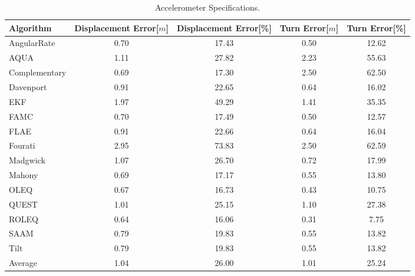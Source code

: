 \begin{table}[H]
    \begin{center}
        \begin{tabular}[t]{lcccc}
            \hline
            Algorithm                   & Displacement Error[$m$] & Displacement Error[\%]      & Turn Error[$m$]  & Turn Error[\%]             \\
            \hline 
            AngularRate            & 0.70  & 17.43 & 0.50 & 12.62              \\            AQUA            & 1.11  & 27.82 & 2.23 & 55.63              \\            Complementary            & 0.69  & 17.30 & 2.50 & 62.50              \\            Davenport            & 0.91  & 22.65 & 0.64 & 16.02              \\            EKF            & 1.97  & 49.29 & 1.41 & 35.35              \\            FAMC            & 0.70  & 17.49 & 0.50 & 12.57              \\            FLAE            & 0.91  & 22.66 & 0.64 & 16.04              \\            Fourati            & 2.95  & 73.83 & 2.50 & 62.59              \\            Madgwick            & 1.07  & 26.70 & 0.72 & 17.99              \\            Mahony            & 0.69  & 17.17 & 0.55 & 13.80              \\            OLEQ            & 0.67  & 16.73 & 0.43 & 10.75              \\            QUEST            & 1.01  & 25.15 & 1.10 & 27.38              \\            ROLEQ            & 0.64  & 16.06 & 0.31 & 7.75              \\            SAAM            & 0.79  & 19.83 & 0.55 & 13.82              \\            Tilt            & 0.79  & 19.83 & 0.55 & 13.82              \\
            \hline
            Average & 1.04 & 26.00 & 1.01 & 25.24
        \end{tabular}
        \caption{Accelerometer Specifications. }
        \label{tab:accelerometer_specification}
    \end{center}
\end{table}